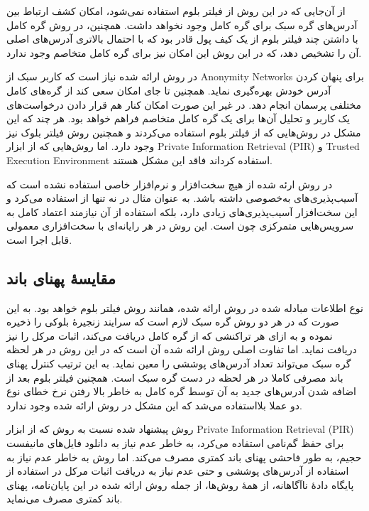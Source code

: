 از آن‌جایی که در این روش از فیلتر بلوم استفاده نمی‌شود، امکان کشف ارتباط بین آدرس‌های گره سبک برای گره کامل وجود نخواهد داشت. همچنین، در روش  \cite{Hearn2013} گره کامل با داشتن چند فیلتر بلوم از یک کیف پول قادر بود که با احتمال بالاتری آدرس‌های اصلی آن را تشخیص دهد، که در این روش این امکان نیز برای گره کامل متخاصم وجود ندارد. 

در روش ارائه شده نیاز است که کاربر سبک از 
\glspl{Anonymity Network}
برای پنهان کردن آدرس  خودش بهره‌گیری نماید. همچنین تا جای امکان سعی کند از گره‌های کامل مختلفی پرسمان انجام دهد. در غیر این صورت امکان کنار هم قرار دادن درخواست‌های یک کاربر و تحلیل آن‌ها برای یک گره کامل متخاصم فراهم خواهد بود. هر چند که این مشکل در روش‌هایی که از فیلتر بلوم استفاده می‌کردند \cite{Hearn2013,Kanemura2017} و همچنین روش فیلتر بلوک \cite{Osuntokun2017} نیز وجود دارد. اما روش‌هایی که از ابزار 
\gls{Private Information Retrieval (PIR)}
\cite{Qin2019} و 
\gls{Trusted Execution Environment}
\cite{Matetic2019} استفاده کرداند فاقد این مشکل هستند.

در روش ارئه شده از هیچ سخت‌افزار و نرم‌افزار خاصی استفاده نشده است که آسیب‌پذیری‌های به‌خصوصی داشته باشد. به عنوان مثال در \cite{Matetic2019}  نه تنها از 
استفاده می‌کرد و این سخت‌افزار آسیب‌پذیری‌های زیادی دارد، بلکه استفاده از آن نیازمند اعتماد کامل به سرویس‌هایی متمرکزی چون \cite{EPID} است. این روش در هر رایانه‌ای با سخت‌افزاری معمولی  قابل اجرا است.

\subsection{مقایسهٔ پهنای باند}
نوع اطلاعات مبادله شده در روش ارائه شده، همانند روش فیلتر بلوم \cite{Hearn2013} خواهد بود. به این صورت که در هر دو روش گره سبک لازم است که سرایند زنجیرهٔ بلوکی را ذخیره نموده و به ازای هر تراکنشی که از گره کامل دریافت می‌کند، اثبات مرکل را نیز دریافت نماید. اما تفاوت اصلی روش ارائه شده آن است که در این روش در هر لحظه گره سبک می‌تواند تعداد آدرس‌های پوششی را معین نماید. به این ترتیب کنترل پهنای باند مصرفی کاملا در هر لحظه در دست گره سبک است. همچنین فیلتر بلوم بعد از اضافه شدن آدرس‌های جدید به آن توسط گره کامل به خاطر بالا رفتن نرخ خطای نوع دو عملا بلااستفاده می‌شد که این مشکل در روش ارائه شده وجود ندارد.

روش پیشنهاد شده نسبت به روش \cite{Qin2019}  که از ابزار 
\gls{Private Information Retrieval (PIR)}
برای حفظ گم‌نامی استفاده می‌کرد، به خاطر عدم نیاز به دانلود فایل‌های مانیفست حجیم، به طور فاحشی پهنای باند کمتری مصرف می‌کند. اما روش  \cite{Matetic2019} به خاطر عدم نیاز به استفاده از آدرس‌های پوششی و حتی عدم نیاز به دریافت اثبات مرکل در استفاده از پایگاه دادهٔ ناآگاهانه، از همهٔ روش‌ها، از جمله روش ارائه شده در این پایان‌نامه، پهنای باند کمتری مصرف می‌نماید.

